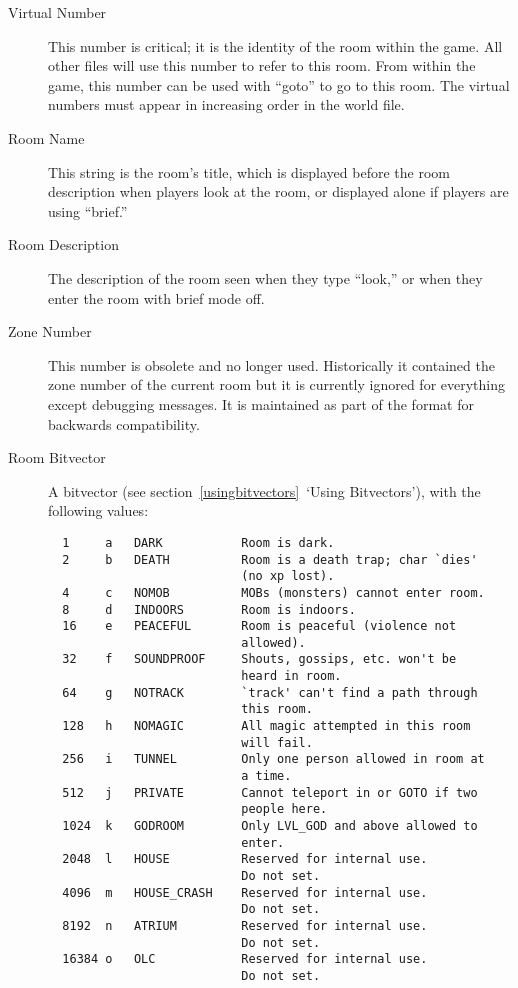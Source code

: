 \documentclass[11pt]{article}
\begin{document}
\begin{description}
\item[Virtual Number]
This number is critical; it is the identity of the room within the game.  All other files will use this number to refer to this room.  From within the game, this number can be used with ``goto'' to go to this room.  The virtual numbers must appear in increasing order in the world file.
\item[Room Name] This string is the room's title, which is displayed before the room description when players look at the room, or displayed alone if players are using ``brief.''
\item[Room Description] The description of the room seen when they type ``look,'' or when they enter the room with brief mode off.
\item[Zone Number] This number is obsolete and no longer used.  Historically it contained the zone number of the current room but it is currently ignored for everything except debugging messages. It is maintained as part of the format for backwards compatibility.
\item[Room Bitvector] A bitvector (see section~\vref{usingbitvectors}~`Using Bitvectors'), with the following values:
\begin{verbatim}
  1     a   DARK           Room is dark.
  2     b   DEATH          Room is a death trap; char `dies'
                           (no xp lost).
  4     c   NOMOB          MOBs (monsters) cannot enter room.
  8     d   INDOORS        Room is indoors.
  16    e   PEACEFUL       Room is peaceful (violence not
                           allowed).
  32    f   SOUNDPROOF     Shouts, gossips, etc. won't be
                           heard in room.
  64    g   NOTRACK        `track' can't find a path through
                           this room.
  128   h   NOMAGIC        All magic attempted in this room
                           will fail.
  256   i   TUNNEL         Only one person allowed in room at
                           a time.
  512   j   PRIVATE        Cannot teleport in or GOTO if two
                           people here.
  1024  k   GODROOM        Only LVL_GOD and above allowed to
                           enter.
  2048  l   HOUSE          Reserved for internal use.
                           Do not set.
  4096  m   HOUSE_CRASH    Reserved for internal use.
                           Do not set.
  8192  n   ATRIUM         Reserved for internal use.
                           Do not set.
  16384 o   OLC            Reserved for internal use.
                           Do not set.

\end{verbatim}
\end{description}
\end{document}
